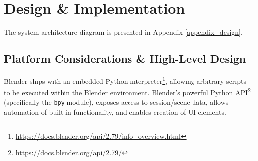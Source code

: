 


\chapter{Design \& Implementation}\label{design_implementation}

The system architecture diagram is presented in Appendix \ref{appendix_design}.

\section{Platform Considerations \& High-Level Design}

Blender ships with an embedded Python interpreter\footnote{\url{https://docs.blender.org/api/2.79/info_overview.html}}, allowing arbitrary scripts to be executed within the Blender environment.
Blender's powerful Python API\footnote{\url{https://docs.blender.org/api/2.79/}} (specifically the \texttt{bpy} module), exposes access to session/scene data, allows automation of built-in functionality, and enables creation of UI elements.

